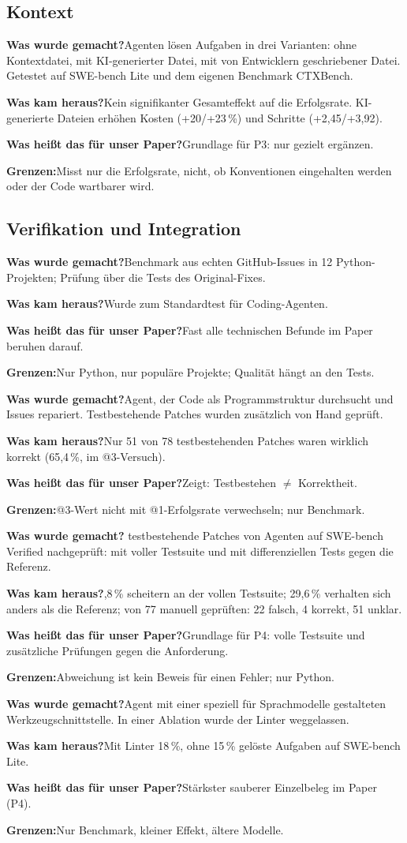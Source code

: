 \documentclass[11pt,a4paper,parskip=half]{scrartcl}
\newcommand{\studie}[6]{%
\begin{tcolorbox}[colback=white,colframe=akzent!50,arc=2pt,boxrule=0.6pt,
  title={\textbf{#1}\hfill\small #2},fonttitle=\color{white},colbacktitle=akzent!80]
\textbf{Was wurde gemacht?}\enskip #3\par
\textbf{Was kam heraus?}\enskip #4\par
\textbf{Was heißt das für unser Paper?}\enskip #5\par
\textbf{Grenzen:}\enskip #6
\end{tcolorbox}}
\begin{document}
\subsection{Kontext}
\studie{Gloaguen et al. (2026): \enquote{Evaluating AGENTS.md}}{ICLR-2026-Workshop}
{Agenten lösen Aufgaben in drei Varianten: ohne Kontextdatei, mit KI-generierter Datei, mit von Entwicklern geschriebener Datei. Getestet auf SWE-bench Lite und dem eigenen Benchmark CTXBench.}
{Kein signifikanter Gesamteffekt auf die Erfolgsrate. KI-generierte Dateien erhöhen Kosten (+20/+23\,\%) und Schritte (+2,45/+3,92).}
{Grundlage für P3: nur gezielt ergänzen.}
{Misst nur die Erfolgsrate, nicht, ob Konventionen eingehalten werden oder der Code wartbarer wird.}

\subsection{Verifikation und Integration}
\studie{Jimenez et al. (2024): SWE-bench}{ICLR}
{Benchmark aus echten GitHub-Issues in 12 Python-Projekten; Prüfung über die Tests des Original-Fixes.}
{Wurde zum Standardtest für Coding-Agenten.}
{Fast alle technischen Befunde im Paper beruhen darauf.}
{Nur Python, nur populäre Projekte; Qualität hängt an den Tests.}

\studie{Zhang et al. (2024): AutoCodeRover}{ISSTA}
{Agent, der Code als Programmstruktur durchsucht und Issues repariert. Testbestehende Patches wurden zusätzlich von Hand geprüft.}
{Nur 51 von 78 testbestehenden Patches waren wirklich korrekt (65,4\,\%, im @3-Versuch).}
{Zeigt: Testbestehen \(\neq\) Korrektheit.}
{@3-Wert nicht mit @1-Erfolgsrate verwechseln; nur Benchmark.}

\studie{Wang, Pradel, Liu (2026): \enquote{Solved issues really solved?}}{ICSE}
{877 testbestehende Patches von Agenten auf SWE-bench Verified nachgeprüft: mit voller Testsuite und mit differenziellen Tests gegen die Referenz.}
{7,8\,\% scheitern an der vollen Testsuite; 29,6\,\% verhalten sich anders als die Referenz; von 77 manuell geprüften: 22 falsch, 4 korrekt, 51 unklar.}
{Grundlage für P4: volle Testsuite und zusätzliche Prüfungen gegen die Anforderung.}
{Abweichung ist kein Beweis für einen Fehler; nur Python.}

\studie{Yang et al. (2024): SWE-agent}{NeurIPS}
{Agent mit einer speziell für Sprachmodelle gestalteten Werkzeugschnittstelle. In einer Ablation wurde der Linter weggelassen.}
{Mit Linter 18\,\%, ohne 15\,\% gelöste Aufgaben auf SWE-bench Lite.}
{Stärkster sauberer Einzelbeleg im Paper (P4).}
{Nur Benchmark, kleiner Effekt, ältere Modelle.}
\end{document}

